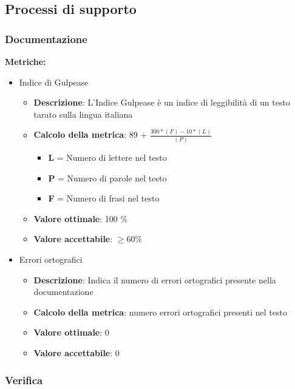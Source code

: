 \documentclass[12pt]{article}
\begin{document}
\subsection{Processi di supporto}
\subsubsection{Documentazione}
\textbf{Metriche:}
\begin{itemize}
	\item Indice di Gulpease
	      \begin{itemize}
		      \item \textbf{Descrizione}: L'Indice Gulpease è un indice di leggibilità di un testo tarato sulla lingua italiana
		      \item \textbf{Calcolo della metrica}:  89 + $\frac{300*(F) - 10 * (L)}{(P)}$
		            \begin{itemize}
			            \item \textbf{L} = Numero di lettere nel testo
			            \item \textbf{P} = Numero di parole nel testo
			            \item \textbf{F} = Numero di frasi nel testo
		            \end{itemize}
		      \item \textbf{Valore ottimale}: 100 \%
		      \item \textbf{Valore accettabile}: $\ge 60\%$
	      \end{itemize}
\end{itemize}
\begin{itemize}
	\item Errori ortografici
	      \begin{itemize}
		      \item \textbf{Descrizione}: Indica il numero di errori ortografici presente nella documentazione
		      \item \textbf{Calcolo della metrica}: numero errori ortografici presenti nel testo
		      \item \textbf{Valore ottimale}: 0
		      \item \textbf{Valore accettabile}: 0
	      \end{itemize}
\end{itemize}

\subsubsection{Verifica}
\end{document}
